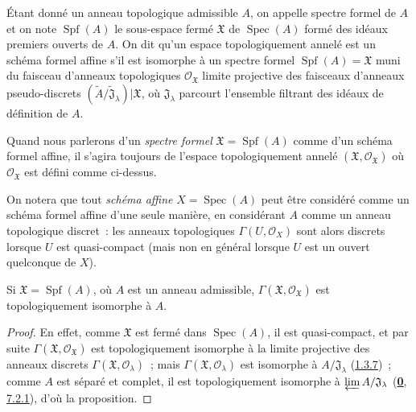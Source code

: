 \begin{definition}[10.1.2]
\label{I.10.1.2-fr}
Étant donné un anneau topologique admissible $A$, on appelle spectre formel
de $A$ et on note $\operatorname{Spf}(A)$ le sous-espace fermé
$\mathfrak{X}$ de $\operatorname{Spec}(A)$ formé des idéaux premiers
ouverts de $A$. On dit qu'un espace topologiquement annelé est un schéma
formel affine s'il est isomorphe à un spectre formel
$\operatorname{Spf}(A)=\mathfrak{X}$ muni du faisceau d'anneaux
topologiques $\mathscr{O}_{\mathfrak{X}}$ limite projective des faisceaux
d'anneaux pseudo-discrets
$(\widetilde{A}/\widetilde{\mathfrak{J}}_\lambda)|\mathfrak{X}$, où
$\mathfrak{J}_\lambda$ parcourt l'ensemble filtrant des idéaux de
définition de $A$.
\end{definition}

Quand nous parlerons d'un \emph{spectre formel}
$\mathfrak{X}=\operatorname{Spf}(A)$ comme d'un schéma formel affine, il
s'agira toujours de l'espace topologiquement annelé
$(\mathfrak{X},\mathscr{O}_{\mathfrak{X}})$ où
$\mathscr{O}_{\mathfrak{X}}$ est défini comme ci-dessus.

On notera que tout \emph{schéma affine} $X=\operatorname{Spec}(A)$ peut être
considéré comme un schéma formel affine d'une seule manière, en considérant
$A$ comme un anneau topologique discret~: les anneaux topologiques
$\Gamma(U,\mathscr{O}_X)$ sont alors discrets lorsque $U$ est
quasi-compact (mais non en général lorsque $U$ est un ouvert quelconque de
$X$).

\begin{proposition}[10.1.3]
\label{I.10.1.3-fr}
Si $\mathfrak{X}=\operatorname{Spf}(A)$, où $A$ est un anneau admissible,
$\Gamma(\mathfrak{X},\mathscr{O}_{\mathfrak{X}})$ est topologiquement
isomorphe à $A$.
\end{proposition}

\begin{proof}
En effet, comme $\mathfrak{X}$ est fermé dans $\operatorname{Spec}(A)$, il
est quasi-compact, et par suite
$\Gamma(\mathfrak{X},\mathscr{O}_{\mathfrak{X}})$ est topologiquement
isomorphe à la limite projective des anneaux discrets
$\Gamma(\mathfrak{X},\mathscr{O}_\lambda)$~; mais
$\Gamma(\mathfrak{X},\mathscr{O}_\lambda)$ est isomorphe à
$A/\mathfrak{J}_\lambda$ (\hyperref[I.1.3.7-fr]{1.3.7})~; comme $A$ est
séparé et complet, il est topologiquement isomorphe à
$\varprojlim A/\mathfrak{J}_\lambda$
(\hyperref[0.7.2.1-fr]{\textbf{0}, 7.2.1}), d'où la proposition.
\end{proof}

